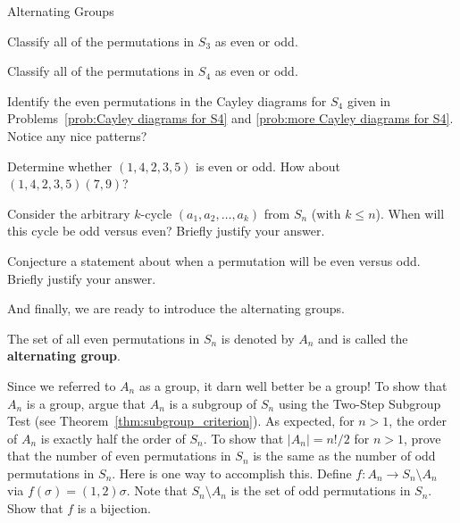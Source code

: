 \begin{section}{Alternating Groups}
\begin{problem}
Classify all of the permutations in $S_3$ as even or odd.
\end{problem}

\begin{problem}
Classify all of the permutations in $S_4$ as even or odd.
\end{problem}

\begin{problem}
Identify the even permutations in the Cayley diagrams for $S_4$ given in Problems~\ref{prob:Cayley diagrams for S4} and \ref{prob:more Cayley diagrams for S4}. Notice any nice patterns?
\end{problem}

\begin{problem}
Determine whether $(1,4,2,3,5)$ is even or odd.  How about $(1,4,2,3,5)(7,9)$?
\end{problem}

\begin{problem}
Consider the arbitrary $k$-cycle $(a_1,a_2,\ldots, a_k)$ from $S_n$ (with $k\leq n$).  When will this cycle be odd versus even?  Briefly justify your answer. 
\end{problem}

\begin{problem}
Conjecture a statement about when a permutation will be even versus odd.  Briefly justify your answer.
\end{problem}

And finally, we are ready to introduce the alternating groups.

\begin{definition}
The set of all even permutations in $S_n$ is denoted by $A_n$ and is called the \textbf{alternating group}.
\end{definition}

Since we referred to $A_n$ as a group, it darn well better be a group! To show that $A_n$ is a group, argue that $A_n$ is a subgroup of $S_n$ using the Two-Step Subgroup Test (see Theorem~\ref{thm:subgroup_criterion}). As expected, for $n>1$, the order of $A_n$ is exactly half the order of $S_n$. To show that $|A_n|=n!/2$ for $n>1$, prove that the number of even permutations in $S_n$ is the same as the number of odd permutations in $S_n$.  Here is one way to accomplish this. Define $f:A_n\to S_n\setminus A_n$ via $f(\sigma)=(1,2)\sigma$.  Note that $S_n\setminus A_n$ is the set of odd permutations in $S_n$. Show that $f$ is a bijection.


\end{section}
